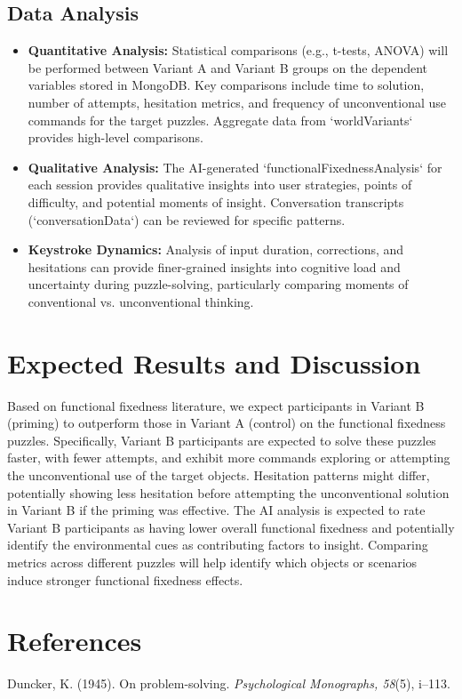 \documentclass{article}
\begin{document}
\subsection{Data Analysis}
\begin{itemize}
    \item \textbf{Quantitative Analysis:} Statistical comparisons (e.g., t-tests, ANOVA) will be performed between Variant A and Variant B groups on the dependent variables stored in MongoDB. Key comparisons include time to solution, number of attempts, hesitation metrics, and frequency of unconventional use commands for the target puzzles. Aggregate data from `worldVariants` provides high-level comparisons.
    \item \textbf{Qualitative Analysis:} The AI-generated `functionalFixednessAnalysis` for each session provides qualitative insights into user strategies, points of difficulty, and potential moments of insight. Conversation transcripts (`conversationData`) can be reviewed for specific patterns.
    \item \textbf{Keystroke Dynamics:} Analysis of input duration, corrections, and hesitations can provide finer-grained insights into cognitive load and uncertainty during puzzle-solving, particularly comparing moments of conventional vs. unconventional thinking.
\end{itemize}

\section{Expected Results and Discussion}

Based on functional fixedness literature, we expect participants in Variant B (priming) to outperform those in Variant A (control) on the functional fixedness puzzles. Specifically, Variant B participants are expected to solve these puzzles faster, with fewer attempts, and exhibit more commands exploring or attempting the unconventional use of the target objects. Hesitation patterns might differ, potentially showing less hesitation before attempting the unconventional solution in Variant B if the priming was effective. The AI analysis is expected to rate Variant B participants as having lower overall functional fixedness and potentially identify the environmental cues as contributing factors to insight. Comparing metrics across different puzzles will help identify which objects or scenarios induce stronger functional fixedness effects.

\section{References}

Duncker, K. (1945). On problem-solving. \textit{Psychological Monographs, 58}(5), i–113.

\end{document}
